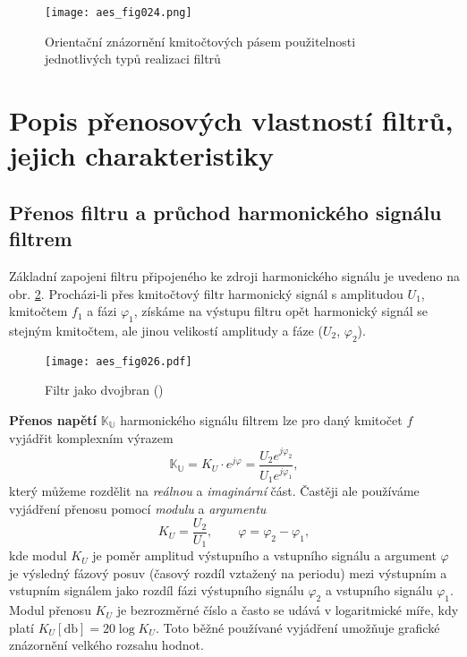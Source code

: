       \begin{figure}[ht!]
        \centering
        \texttt{[image: aes\_fig024.png]}
        \caption{Orientační znázornění kmitočtových pásem použitelnosti jednotlivých typů realizaci
                 filtrů}
        \label{aes:fig024}    
      \end{figure} 

  \section{Popis přenosových vlastností filtrů, jejich charakteristiky}
    \subsection{Přenos filtru a průchod harmonického signálu filtrem}
      Základní zapojeni filtru připojeného ke zdroji harmonického signálu je uvedeno na obr.
      \ref{aes:fig026}. Procházi-li přes kmitočtový filtr harmonický signál s amplitudou \(U_1\),
      kmitočtem \(f_1\) a fázi \(\varphi_1\), získáme na výstupu filtru opět harmonický signál se
      stejným kmitočtem, ale jinou velikostí amplitudy a fáze (\(U_2\), \(\varphi_2\)).
  
      \begin{figure}[ht!]
        \centering
        \texttt{[image: aes\_fig026.pdf]}
        \caption{Filtr jako dvojbran (\cite[s.~25]{HajekSedlacek2002})}
        \label{aes:fig026}    
      \end{figure}
      
      \textbf{Přenos napětí} \(\mathbb{K_U}\) harmonického signálu filtrem lze pro daný kmitočet
      \(f\) vyjádřit komplexním výrazem
      \begin{equation*}
        \mathbb{K_U} = K_U\cdot e^{j\varphi} = \frac{U_2e^{j\varphi_2}}{U_1e^{j\varphi_1}},
      \end{equation*}
      který můžeme rozdělit na \emph{reálnou} a \emph{imaginární} část. Častěji ale používáme
      vyjádření přenosu pomocí \emph{modulu} a \emph{argumentu}
      \begin{equation*}
        K_U = \frac{U_2}{U_1}, \qquad \varphi = \varphi_2 - \varphi_1, 
      \end{equation*}
      kde modul \(K_U\) je poměr amplitud výstupního a vstupního signálu a argument \(\varphi\) je
      výsledný fázový posuv (časový rozdíl vztažený na periodu) mezi výstupním a vstupním signálem
      jako rozdíl fázi výstupního signálu \(\varphi_2\) a vstupního signálu \(\varphi_1\). Modul
      přenosu \(K_U\) je bezrozměrné číslo a často se udává v logaritmické míře, kdy platí \(K_U
      [\unit{\decibel}] = 20 \log{K_U}\). Toto běžné používané vyjádření umožňuje grafické znázornění
      velkého rozsahu hodnot.

